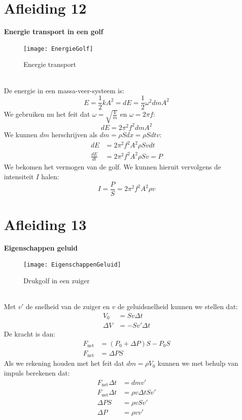 \documentclass[a4paper,kul]{kulakarticle} %
\begin{document}
\section{Afleiding 12}
\textbf{Energie transport in een golf}\\
\begin{figure}[h]
	\centering
	\texttt{[image: EnergieGolf]}
	\caption[Energie transport]{Energie transport}
	\label{fig:energietransport}
\end{figure}\\
De energie in een massa-veer-systeem is:
\begin{equation*}
	E = \frac{1}{2}kA^2 = dE = \frac{1}{2}\omega^2dmA^2
\end{equation*}
We gebruiken nu het feit dat $\omega = \sqrt{\frac{k}{m}} $ en $\omega = 2\pi f$:
\begin{equation*}
	dE = 2\pi^2f^2dmA^2
\end{equation*}
We kunnen $dm$ herschrijven als $dm = \rho Sdx = \rho Sdtv$:
\begin{align*}
	dE &= 2\pi^2f^2A^2\rho Svdt\\
	\frac{dE}{dt} &= 2\pi^2f^2A^2\rho Sv = P
\end{align*}
We bekomen het vermogen van de golf. We kunnen hieruit vervolgens de intensiteit $I$ halen:
\begin{equation*}
	I = \frac{P}{S} = 2\pi^2f^2A^2\rho v
\end{equation*}
\newpage
\section{Afleiding 13}
\textbf{Eigenschappen geluid}\\
\begin{figure}[h]
	\centering
	\texttt{[image: EigenschappenGeluid]}
	\caption[Zuiger]{Drukgolf in een zuiger}
	\label{fig:drukgolfzuiger}
\end{figure}\\
Met $v'$ de snelheid van de zuiger en $v$ de geluidsnelheid kunnen we stellen dat:
\begin{align*}
	V_0 &=Sv\Delta t\\
	\Delta V &= -Sv'\Delta t
\end{align*}
De kracht is dan:
\begin{align*}
	F_{\text{net}} &= (P_0+\Delta P)S-P_0S\\
	F_{\text{net}}&= \Delta PS
\end{align*}
Als we rekening houden met het feit dat $dm=\rho V_0$ kunnen we met behulp van impuls berekenen dat:
\begin{align*}
	F_{\text{net}} \Delta t &=dmv'\\
	F_{\text{net}}\Delta t &= \rho v\Delta tSv'\\
	\Delta PS &= \rho vSv'\\
	\Delta P &= \rho vv'
\end{align*}
\newpage
\end{document}
